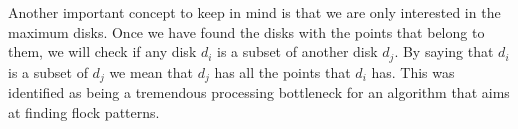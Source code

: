 Another important concept to keep in mind is that we are only interested in the maximum disks. Once we have found the
disks with the points that belong to them, we will check if any disk $d_i$ is a subset of another disk $d_j$. By saying
that $d_i$ is a subset of $d_j$ we mean that $d_j$ has all the points that $d_i$ has. This was identified as being a
tremendous processing bottleneck for an algorithm that aims at finding flock patterns.
